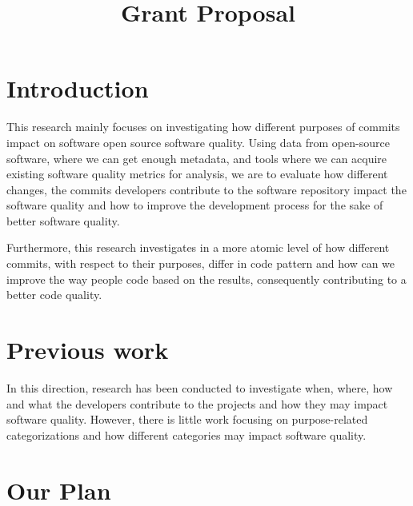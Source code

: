 \documentclass[10pt,conference]{IEEEtran}
\begin{document}
\title{Grant Proposal}

\author{
}

\maketitle


\section{Introduction}


This research mainly focuses on investigating how different purposes of commits impact on software open source software quality. 
Using data from open-source software, where we can get enough metadata, and tools where we can acquire existing software quality metrics for analysis, we are to evaluate how different changes, the commits developers contribute to the software repository impact the software quality and how to improve the development process for the sake of better software quality. 

Furthermore, this research investigates in a more atomic level of how different commits, with respect to their purposes, differ in code pattern and how can we improve the way people code based on the results, consequently contributing to a better code quality.

\section{Previous work}

In this direction, research has been conducted to investigate when, where, how and what the developers contribute to the projects and how they may impact software quality. However, there is little work focusing on purpose-related categorizations and how different categories may impact software quality.

\section{Our Plan}
\end{document}
